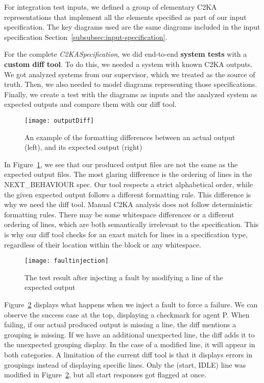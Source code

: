 For integration test inputs, we defined a group of elementary C2KA representations that implement
all the elements specified as part of our input specification.
The key diagrams used are the same diagrams included in the input specification Section~\ref{subsubsec:input-specification}.

For the complete \textit{C2KASpecification}, we did end-to-end \textbf{system tests} with a \textbf{custom diff tool}.
To do this, we needed a system with known C2KA outputs.
We got analyzed systems from our supervisor, which we treated as the source of truth.
Then, we also needed to model diagrams representing those specifications.
Finally, we create a test with the diagrams as inputs and the analyzed system as expected outputs and compare them with our diff tool.

\begin{figure}
    \centering
    \texttt{[image: outputDiff]}
    \caption{An example of the formatting differences between an actual output (left), and its expected output (right)}
    \label{fig:out-diff}
\end{figure}
In Figure~\ref{fig:out-diff}, we see that our produced output files are not the same as the expected output files.
The most glaring difference is the ordering of lines in the NEXT\_BEHAVIOUR spec.
Our tool respects a strict alphabetical order, while the given expected output follows a different formatting rule.
This difference is why we need the diff tool.
Manual C2KA analysis does not follow deterministic formatting rules.
There may be some whitespace differences or a different ordering of lines, which are both semantically irrelevant to the specification.
This is why our diff tool checks for an exact match for lines in a specification type,
regardless of their location within the block or any whitespace.

\begin{figure}
    \centering
    \texttt{[image: faultinjection]}
    \caption{The test result after injecting a fault by modifying a line of the expected output}
    \label{fig:faultinjection}
\end{figure}
Figure~\ref{fig:faultinjection} displays what happens when we inject a fault to force a failure.
We can observe the success case at the top, displaying a checkmark for agent P\@.
When failing, if our actual produced output is missing a line, the diff mentions a grouping is missing.
If we have an additional unexpected line, the diff adds it to the unexpected grouping display.
In the case of a modified line, it will appear in both categories.
A limitation of the current diff tool is that it displays errors in groupings instead of displaying specific lines.
Only the (start, IDLE) line was modified in Figure~\ref{fig:faultinjection}, but all start responses got flagged at once.

